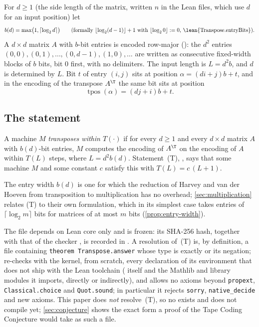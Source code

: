 For $d\ge1$ (the side length of the matrix, written $n$ in the Lean files, which use $d$ for an input position) let
\[
  b(d)=\max\bigl(1,\lceil\log_2 d\rceil\bigr)
  \qquad\text{(formally } \lfloor\log_2(d-1)\rfloor+1\text{ with }\lfloor\log_2 0\rfloor:=0\text{, \lean{Transpose.entryBits})}.
\]
A $d\times d$ matrix $A$ with $b$-bit entries is encoded row-major
(): the $d^2$ entries $(0,0),(0,1),\dots,(0,d-1),(1,0),\dots$ are written
as consecutive fixed-width blocks of $b$ bits, bit $0$ first, with no delimiters. The input length
is $L=d^2b$, and $d$ is determined by $L$. Bit $t$ of entry $(i,j)$ sits at position
$\alpha=(di+j)b+t$, and in the encoding of the transpose $A^{\T}$ the same bit sits at position
\[
  \operatorname{tpos}(\alpha)=(dj+i)b+t .
\]

\subsection{The statement}

\begin{definition}[Statement (T)]\label{def:T}
A machine $M$ \emph{transposes within $T(\cdot)$} if for every $d\ge1$ and every $d\times d$
matrix $A$ with $b(d)$-bit entries, $M$ computes the encoding of $A^{\T}$ on the encoding of $A$
within $T(L)$ steps, where $L=d^2b(d)$. Statement~(T), ,
says that some machine $M$ and some constant $c$ satisfy this with $T(L)=c\,(L+1)$.
\end{definition}

The entry width $b(d)$ is one for which the reduction of Harvey and van der Hoeven from transposition to
multiplication has no overhead; \cref{sec:multiplication} relates (T) to their own formulation, which in its simplest case takes entries of $\lceil\log_2m\rceil$ bits for matrices of at most $m$ bits (\cref{prop:entry-width}).

The file  depends on Lean core only and is frozen: its SHA-256
hash, together with that of the checker , is recorded in
. A resolution of~(T) is, by definition, a file
 containing \texttt{theorem Transpose.answer} whose type is exactly
 or its negation;  re-checks with the kernel, from scratch, every declaration of its environment
that does not ship with the Lean toolchain ( itself and the Mathlib and library modules it imports, directly or indirectly), and allows no axioms beyond
\texttt{propext}, \texttt{Classical.choice} and \texttt{Quot.sound}; in particular it rejects
\texttt{sorry}, \texttt{native\_decide} and new axioms. This paper does \emph{not} resolve~(T), so no  exists and
 does not compile yet; \cref{sec:conjecture} shows the exact form a proof of
the Tape Coding Conjecture would take as such a file.

